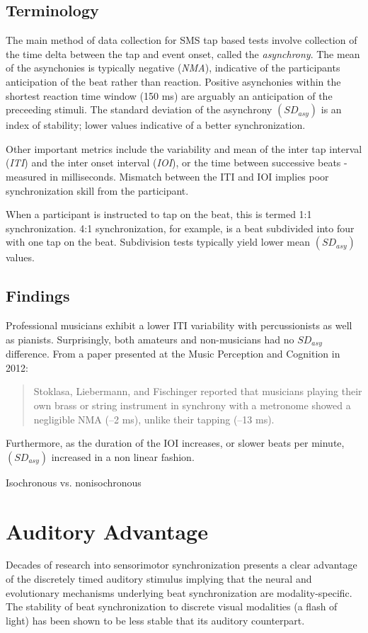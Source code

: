 \subsection{Terminology} \label{SMSTerms}
The main method of data collection for SMS tap based tests involve collection of the time delta between the tap and event onset, called the \textit{asynchrony}. The mean of the asynchonies is typically negative (\textit{NMA}), indicative of the participants anticipation of the beat rather than reaction. Positive asynchonies within the shortest reaction time window (150 ms) are arguably an anticipation of the preceeding stimuli. The standard deviation of the asynchrony $(SD_{asy})$ is an index of stability; lower values indicative of a better synchronization.  \cite{repp2013sensorimotor}

Other important metrics include the variability and mean of the inter tap interval (\textit{ITI}) and the inter onset interval (\textit{IOI}), or the time between successive beats - measured in milliseconds. Mismatch between the ITI and IOI implies poor synchronization skill from the participant. 

When a participant is instructed to tap on the beat, this is termed 1:1 synchronization. 4:1 synchronization, for example, is a beat subdivided into four with one tap on the beat. Subdivision tests typically yield lower mean $(SD_{asy})$ values. \cite{repp2013sensorimotor}

\subsection{Findings} \label{SMSFindings}
Professional musicians exhibit a lower ITI variability with percussionists as well as pianists. Surprisingly, both amateurs and non-musicians had no $SD_{asy}$ difference. From a paper presented at the Music Perception and Cognition in 2012:
\begin{quotation}
    Stoklasa, Liebermann, and Fischinger reported that musicians playing their own brass or string instrument in synchrony with a metronome showed a negligible NMA (–2 ms), unlike their tapping (–13 ms). \cite{repp2013sensorimotor}
\end{quotation}

Furthermore, as the duration of the IOI increases, or slower beats per minute, $(SD_{asy})$ increased in a non linear fashion. 

Isochronous vs. nonisochronous ~\cite{polak2016both}


\section{Auditory Advantage}
Decades of research into sensorimotor synchronization presents a clear advantage of the discretely timed auditory stimulus implying that the neural and evolutionary mechanisms underlying beat synchronization are modality-specific.
~\cite{gan2015synchronization} The stability of beat synchronization to discrete visual modalities (a flash of light) has been shown to be less stable that its auditory counterpart.

